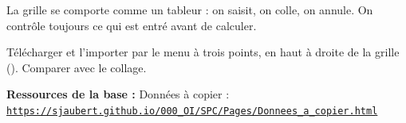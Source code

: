 \documentclass[10pt,a4paper]{article}
\begin{document}
\begin{tcolorbox}[retenir]La grille se comporte comme un tableur : on saisit, on colle, on annule. On contrôle toujours ce qui est entré avant de calculer.\end{tcolorbox}
\begin{tcolorbox}[plus]Télécharger  et l'importer par le menu à trois points, en haut à droite de la grille (). Comparer avec le collage.\end{tcolorbox}
\vfill{\footnotesize\color{uimm}\textbf{Ressources de la base :} Données à copier : \href{https://sjaubert.github.io/000_OI/SPC/Pages/Donnees_a_copier.html\#butees30}{\nolinkurl{https://sjaubert.github.io/000_OI/SPC/Pages/Donnees_a_copier.html}}}
\end{document}
